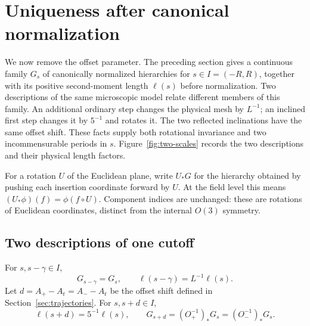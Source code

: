 \section{Uniqueness after canonical normalization}\label{sec:uniqueness}

We now remove the offset parameter.  The preceding section gives a
continuous family $G_s$ of canonically normalized hierarchies for
$s\in I=(-R,R)$, together with its positive second-moment length
$\ell(s)$ before normalization.  Two descriptions of the same microscopic
model relate different members of this family.  An additional ordinary
step changes the physical mesh by $L^{-1}$; an inclined first step changes
it by $5^{-1}$ and rotates it.  The two reflected inclinations have the
same offset shift.  These facts supply both rotational invariance and two
incommensurable periods in $s$.
Figure~\ref{fig:two-scales} records the two descriptions and their
physical length factors.

For a rotation $U$ of the Euclidean plane, write $U_*G$ for the hierarchy obtained by
pushing each insertion coordinate forward by $U$.  At the field level
this means $(U_*\phi)(f)=\phi(f\circ U)$.  Component indices are unchanged:
these are rotations of Euclidean coordinates, distinct from the internal $O(3)$ symmetry.

\subsection{Two descriptions of one cutoff}

\begin{proposition}\label{prop:two-scales}
For $s,s-\gamma\in I$,
\begin{equation}\label{eq:uni-depth}
 G_{s-\gamma}=G_s,
 \qquad \ell(s-\gamma)=L^{-1}\ell(s).
\end{equation}
Let $d=A_+-A_{\mathrm r}=A_--A_{\mathrm r}$ be the offset shift
defined in Section~\ref{sec:trajectories}.  For $s,s+d\in I$,
\begin{equation}\label{eq:uni-incline}
 \ell(s+d)=5^{-1}\ell(s),\qquad
 G_{s+d}=(O_+^{-1})_*G_s=(O_-^{-1})_*G_s.
\end{equation}
\end{proposition}

